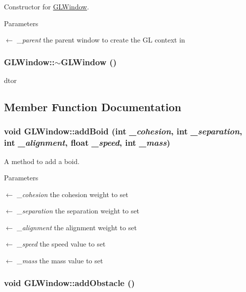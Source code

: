 Constructor for \hyperlink{classGLWindow}{GLWindow}. 
\begin{DoxyParams}{Parameters}
\item[\mbox{$\leftarrow$} {\em \_\-parent}]the parent window to create the GL context in \end{DoxyParams}
\hypertarget{classGLWindow_a2eeaea2148f4f72344edd6d1bac9759b}{
\subsubsection[{$\sim$GLWindow}]{\setlength{\rightskip}{0pt plus 5cm}GLWindow::$\sim$GLWindow ()}}
\label{classGLWindow_a2eeaea2148f4f72344edd6d1bac9759b}


dtor 

\subsection{Member Function Documentation}
\hypertarget{classGLWindow_a73b0e5d5c2f1736259cf40e3eccf7036}{
\subsubsection[{addBoid}]{\setlength{\rightskip}{0pt plus 5cm}void GLWindow::addBoid (int {\em \_\-cohesion}, \/  int {\em \_\-separation}, \/  int {\em \_\-alignment}, \/  float {\em \_\-speed}, \/  int {\em \_\-mass})}}
\label{classGLWindow_a73b0e5d5c2f1736259cf40e3eccf7036}


A method to add a boid. 
\begin{DoxyParams}{Parameters}
\item[\mbox{$\leftarrow$} {\em \_\-cohesion}]the cohesion weight to set \item[\mbox{$\leftarrow$} {\em \_\-separation}]the separation weight to set \item[\mbox{$\leftarrow$} {\em \_\-alignment}]the alignment weight to set \item[\mbox{$\leftarrow$} {\em \_\-speed}]the speed value to set \item[\mbox{$\leftarrow$} {\em \_\-mass}]the mass value to set \end{DoxyParams}
\hypertarget{classGLWindow_a78fd529f5072ec167c68417d5c2359cc}{
\subsubsection[{addObstacle}]{\setlength{\rightskip}{0pt plus 5cm}void GLWindow::addObstacle ()}}
\label{classGLWindow_a78fd529f5072ec167c68417d5c2359cc}


